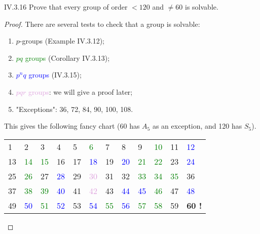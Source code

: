 \begin{problem}{IV.3.16}
Prove that every group of order $<120$ and $\neq 60$ is solvable.
\end{problem}
\begin{proof}
There are several tests to check that a group is solvable:
\begin{enumerate}[label=(\roman*)]
\setlength\itemsep{0pt}
\item \textcolor{BrickRed}{$p$-groups} (Example IV.3.12);
\item \textcolor{green}{$pq$ groups} (Corollary IV.3.13);
\item \textcolor{blue}{$p^nq$ groups} (IV.3.15);
\item \textcolor{Plum}{$pqr$ groups}: we will give a proof later;
\item "Exceptions": 36, 72, 84, 90, 100, 108.
\end{enumerate}
This gives the following fancy chart (60 has $A_5$ as an exception, and 120 has $S_5$). 
\begin{center}
\begin{tabular}{llllllllllll}
\textcolor{BrickRed}{1} &\textcolor{BrickRed}{2} &\textcolor{BrickRed}{3} &\textcolor{BrickRed}{4} &\textcolor{BrickRed}{5} &\textcolor{green}{6} &\textcolor{BrickRed}{7} &\textcolor{BrickRed}{8} &\textcolor{BrickRed}{9} &\textcolor{green}{10} &\textcolor{BrickRed}{11} &\textcolor{blue}{12} \\
\textcolor{BrickRed}{13} &\textcolor{green}{14} &\textcolor{green}{15} &\textcolor{BrickRed}{16} &\textcolor{BrickRed}{17} &\textcolor{blue}{18} &\textcolor{BrickRed}{19} &\textcolor{blue}{20} &\textcolor{green}{21} &\textcolor{green}{22} &\textcolor{BrickRed}{23} &\textcolor{blue}{24} \\
\textcolor{BrickRed}{25} &\textcolor{green}{26} &\textcolor{BrickRed}{27} &\textcolor{blue}{28} &\textcolor{BrickRed}{29} &\textcolor{Plum}{30} &\textcolor{BrickRed}{31} &\textcolor{BrickRed}{32} &\textcolor{green}{33} &\textcolor{green}{34} &\textcolor{green}{35} &36 \\
\textcolor{BrickRed}{37} &\textcolor{green}{38} &\textcolor{green}{39} &\textcolor{blue}{40} &\textcolor{BrickRed}{41} &\textcolor{Plum}{42} &\textcolor{BrickRed}{43} &\textcolor{blue}{44} &\textcolor{blue}{45} &\textcolor{green}{46} &\textcolor{BrickRed}{47} &\textcolor{blue}{48} \\
\textcolor{BrickRed}{49} &\textcolor{blue}{50} &\textcolor{green}{51} &\textcolor{blue}{52} &\textcolor{BrickRed}{53} &\textcolor{blue}{54} &\textcolor{green}{55} &\textcolor{blue}{56} &\textcolor{green}{57} &\textcolor{green}{58} &\textcolor{BrickRed}{59} &\textbf{60 !} \\

\end{tabular}
\end{center}
\end{proof}

